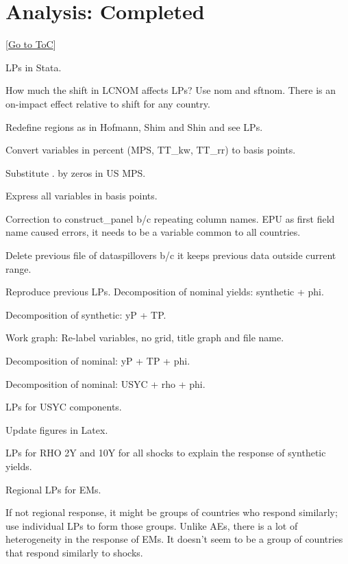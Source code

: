 \documentclass[12pt]{article}
\newcommand{\gototoc}{\vspace{-1.8cm} \null\hfill [\hyperlink{toc}{Go to ToC}] \newline}
\newcommand{\cmark}{\ding{51}}
\newcommand{\xmark}{\ding{55}}
\newcommand{\done}{\rlap{$\square$}{\raisebox{2pt}{\large\hspace{1pt}\cmark}}%
	\hspace{-2.5pt}}
\newcommand{\wontdo}{\rlap{$\square$}{\large\hspace{1pt}\xmark}}
\begin{document}
\section{Analysis: Completed}
\gototoc
	\begin{todolist}
	\item[\done] LPs in Stata.
	\begin{todolist}
		\item[\done] How much the shift in LCNOM affects LPs? Use nom and sftnom. There is an on-impact effect relative to shift for any country.
		\item[\done] Redefine regions as in Hofmann, Shim and Shin and see LPs.
		\item[\done] Convert variables in percent (MPS, TT_kw, TT_rr) to basis points.
		\item[\done] Substitute . by zeros in US MPS.
		\item[\done] Express all variables in basis points.
		\item[\done] Correction to construct_panel b/c repeating column names. EPU as first field name caused errors, it needs to be a variable common to all countries.
		\item[\done] Delete previous file of dataspillovers b/c it keeps previous data outside current range.
		\item[\done] Reproduce previous LPs. Decomposition of nominal yields: synthetic + phi.
		\item[\done] Decomposition of synthetic: yP + TP.
		\item[\done] Work graph: Re-label variables, no grid, title graph and file name.
		\item[\done] Decomposition of nominal: yP + TP + phi.
		\item[\done] Decomposition of nominal: USYC + rho + phi.
		\item[\done] LPs for USYC components.
		\item[\done] Update figures in Latex.
		\item[\done] LPs for RHO 2Y and 10Y for all shocks to explain the response of synthetic yields.
		\item[\done] Regional LPs for EMs.
		\item[\wontdo] If not regional response, it might be groups of countries who respond similarly; use individual LPs to form those groups. Unlike AEs, there is a lot of heterogeneity in the response of EMs. It doesn't seem to be a group of countries that respond similarly to shocks.
	\end{todolist}

\end{todolist}
\end{document}
